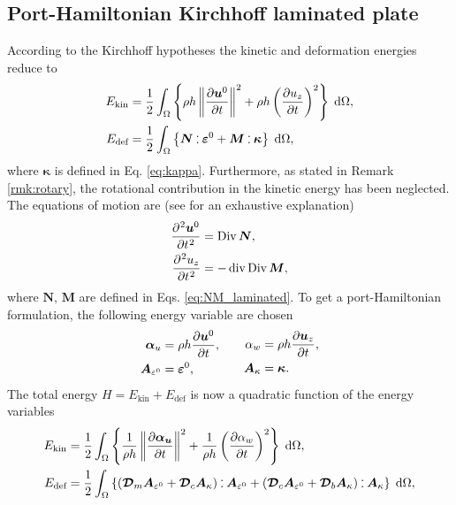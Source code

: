 \subsection{Port-Hamiltonian Kirchhoff laminated plate}
According to the Kirchhoff hypotheses the kinetic and deformation energies reduce to 
\begin{equation*}
\begin{aligned}
E_{\text{kin}} &= \energy{\rho h \norm{\diffp{\bm{u}^0}{t}}^2 + \rho h \left(\diffp{u_z}{t}\right)^2}, \\
E_{\text{def}} &= \energy{\bm{N} \cddot \bm{\varepsilon}^0 + \bm{M} \cddot \bm{\kappa}}, 
\end{aligned}
\end{equation*}
where $\bm{\kappa}$ is defined in Eq. \eqref{eq:kappa}. Furthermore, as stated in Remark \ref{rmk:rotary}, the rotational contribution in the kinetic energy has been neglected. The equations of motion are (see \cite[Chapter~3]{reddy2003mechanics} for an exhaustive explanation)
\begin{equation}\label{eq:sysLamKir}
\begin{aligned}
\diffp[2]{\bm{u}^0}{t} &= \Div \bm{N}, \\
\diffp[2]{{u}_z}{t} &= -\div\Div \bm{M}, 
\end{aligned}	
\end{equation}
where $\bm{N}, \, \bm{M}$ are defined in Eqs. \eqref{eq:NM_laminated}. 
To get a port-Hamiltonian formulation, the following energy variable are chosen
\begin{equation}
\begin{aligned}
\bm{\alpha}_u &= \rho h \diffp{\bm{u}^0}{t}, \\
\bm{A}_{\varepsilon^0} &= \bm{\varepsilon}^0,
\end{aligned} \qquad
\begin{aligned}
{\alpha}_w &= \rho h \diffp{\bm{u}_z}{t}, \\
\bm{A}_{\kappa} &= \bm{\kappa}.
\end{aligned} 
\end{equation} 
The total energy $H=E_{\text{kin}} + E_{\text{def}}$ is now a quadratic function of the energy variables
\begin{equation*}
\begin{aligned}
E_{\text{kin}} &= \energy{\frac{1}{\rho h} \norm{\diffp{\bm{\alpha_u}}{t}}^2 + \frac{1}{\rho h} \left(\diffp{\alpha_w}{t}\right)^2}, \\
E_{\text{def}} &= \energy{(\bm{\mathcal{D}}_m \bm{A}_{\varepsilon^0} + \bm{\mathcal{D}}_c \bm{A}_{\kappa}) \cddot \bm{A}_{\varepsilon^0} + (\bm{\mathcal{D}}_c \bm{A}_{\varepsilon^0} + \bm{\mathcal{D}}_b \bm{A}_{\kappa}) \cddot \bm{A}_{\kappa}}, 
\end{aligned}
\end{equation*}
